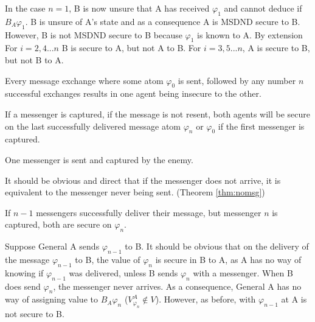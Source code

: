 In the case $n=1$, B is now unsure that A has received $\varphi_1$ and cannot deduce if $B_{A} \varphi_1$. B is unsure of A's state and as a consequence A is MSDND secure to B. However, B is not MSDND secure to B because $\varphi_1$ is known to A. By extension For $i=2,4...n$ B is secure to A, but not A to B. For $i=3,5...n$, A is secure to B, but not B to A.

\begin{cor}
Every message exchange where some atom $\varphi_0$ is sent, followed by any number $n$ successful exchanges results in one agent being insecure to the other.
\end{cor}

\begin{thm}
If a messenger is captured, if the message is not resent, both agents will be secure on the last successfully delivered message atom $\varphi_{n}$ or $\varphi_0$ if the first messenger is captured.
\label{thm:captured}
\end{thm}

\begin{case}
One messenger is sent and captured by the enemy.
\end{case}

It should be obvious and direct that if the messenger does not arrive, it is equivalent to the messenger never being sent. (Theorem \ref{thm:nomsg})

\begin{case}
If $n-1$ messengers successfully deliver their message, but messenger $n$ is captured, both are secure on $\varphi_{n}$.
\end{case}

Suppose General A sends $\varphi_{n-1}$ to B. It should be obvious that on the delivery of the message $\varphi_{n-1}$ to B, the value of $\varphi_{n}$ is secure in B to A, as A has no way of knowing if $\varphi_{n-1}$ was delivered, unless B sends $\varphi_{n}$ with a messenger. When B does send $\varphi_{n}$, the messenger never arrives. As a consequence, General A has no way of assigning value to $B_A \varphi_n$ ($V_{\varphi_n}^A \not \in V$). However, as before, with $\varphi_{n-1}$ at A is not secure to B.



